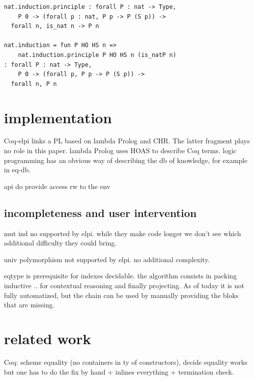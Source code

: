 \documentclass[sigplan,10pt,review]{acmart}\settopmatter{printfolios=true,printccs=false,printacmref=false}
\begin{document}
\begin{lstlisting}
nat.induction.principle : forall P : nat -> Type,
    P 0 -> (forall p : nat, P p -> P (S p)) ->
  forall n, is_nat n -> P n

nat.induction = fun P HO HS n =>
    nat.induction.principle P HO HS n (is_natP n)
: forall P : nat -> Type,
    P 0 -> (forall p, P p -> P (S p)) ->
  forall n, P n
\end{lstlisting}


\section{implementation} %

Coq-elpi links a PL based on lambda Prolog and CHR.
The latter fragment plays no role in this paper.
lambda Prolog uses HOAS to describe Coq terms.
logic programming has an obvious way of describing the db of
knowledge, for example in eq-db.

api do provide access rw to the env

\subsection{incompleteness and user intervention} %

mut ind no supported by elpi. while they make code longer we don't see
which additional difficulty they could bring.

univ polymorphism not supported by elpi. no additional complexity.

eqtype is prerequisite for indexes decidable. the algorithm
consists in packing inductive { .. } for contextual reasoning
and finally projecting. As of today it is not fully automatized, but
the chain can be used by manually providing the bloks that are missing.

\section{related work} %

Coq: scheme equality (no containers in ty of constructors),
decide equality works but one has to do the fix by hand + inlines everything
+ termination check.
\end{document}
